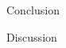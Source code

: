 \documentclass[fleqn]{beamer}
\begin{document}




\begin{section}{Conclusion}
\begin{frame}
  \begin{center}
 \huge Discussion   
  \end{center}
\end{frame}
\end{section}
\end{document}
